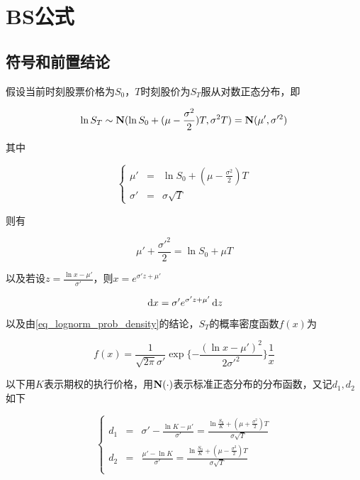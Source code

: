 \section{BS公式}

\subsection{符号和前置结论}

假设当前时刻股票价格为$S_0$，$T$时刻股价为$S_T$服从对数正态分布，即

\begin{equation}
    \ln S_T \sim \mathbf{N}(\ln S_0 + (\mu - \frac{\sigma^2}{2})T, \sigma^2T) = \mathbf{N}(\mu', \sigma'^2)
\end{equation}

其中

\begin{equation}
    \left\{
    \begin{array}{rcl}
        \mu'    & = & \ln S_0 + (\mu - \frac{\sigma^2}{2})T \\
        \sigma' & = & \sigma\sqrt{T}
    \end{array}
    \right.
\end{equation}

则有

\begin{equation}
    \mu' + \frac{\sigma'^2}{2} = \ln S_0 + \mu T
\end{equation}

以及若设$z = \frac{\ln x - \mu'}{\sigma'}$，则$x = e^{\sigma'z + \mu'}$

\begin{equation}
    \,\mathrm{d} x = \sigma' e^{\sigma'z + \mu'} \,\mathrm{d} z
\end{equation}

以及由\ref{eq_lognorm_prob_density}的结论，$S_T$的概率密度函数$f(x)$为

\begin{equation}
    f(x) = \frac{1}{\sqrt{2\pi}\sigma'}\exp\{-\frac{(\ln x - \mu')^2}{2\sigma'^2}\}\frac{1}{x}
\end{equation}

以下用$K$表示期权的执行价格，用$\mathbf{N}(\cdot)$表示标准正态分布的分布函数，又记$d_1, d_2$如下

\begin{equation}
    \left\{
    \begin{array}{rcl}
        d_1 & = & \sigma' - \frac{\ln K -\mu'}{\sigma'} =\frac{\ln \frac{S_0}{K} + (\mu + \frac{\sigma^2}{2})T }{\sigma\sqrt{T}} \\
        d_2 & = & \frac{\mu' - \ln K}{\sigma'} =\frac{\ln \frac{S_0}{K} + (\mu - \frac{\sigma^2}{2})T}{\sigma\sqrt{T}}           \\
    \end{array}
    \right.
\end{equation}

